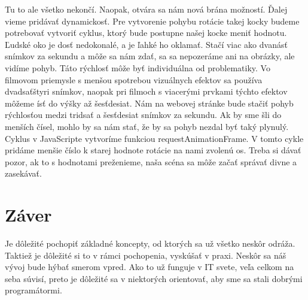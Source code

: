 \documentclass[10pt,oneside,slovak,a4paper]{article}
\begin{document}
Tu to ale všetko nekončí. Naopak, otvára sa nám nová brána možností.  Ďalej vieme pridávať dynamickosť.
Pre vytvorenie pohybu rotácie takej kocky budeme potrebovať vytvoriť cyklus, ktorý bude postupne našej kocke meniť hodnotu.
Ľudské oko je dosť nedokonalé, a je ľahké ho oklamať.
Stačí viac ako dvanásť snímkov za sekundu a môže sa nám zdať, sa  sa nepozeráme ani na obrázky, ale vidíme pohyb.
Táto rýchlosť môže byť individuálna od problematiky.
Vo filmovom priemysle s menšou spotrebou vizuálnych efektov sa používa dvadsaťštyri snímkov, naopak pri filmoch s viacerými prvkami týchto efektov môžeme ísť do výšky až šesťdesiat.
Nám na webovej stránke bude stačiť  pohyb rýchlosťou medzi tridsať  a šesťdesiat snímkov za sekundu.
Ak by sme šli do menších čísel, mohlo by sa nám stať, že by sa pohyb nezdal byť taký plynulý.
Cyklus v JavaScripte vytvoríme funkciou requestAnimationFrame. V tomto cykle pridáme menšie číslo k starej hodnote rotácie na nami zvolenú os.
Treba si dávať pozor, ak to s hodnotami preženieme, naša scéna sa môže začať správať divne a zasekávať.

\section{Záver}

Je dôležité pochopiť základné koncepty, od ktorých sa už všetko neskôr odráža.
Taktiež  je dôležité si to v rámci pochopenia, vyskúšať v praxi. Neskôr sa náš vývoj bude hýbať smerom vpred.
Ako to už funguje v IT svete, veľa celkom na seba súvisí, preto je dôležité sa v niektorých orientovať, aby sme sa stali dobrými programátormi.



\end{document}
